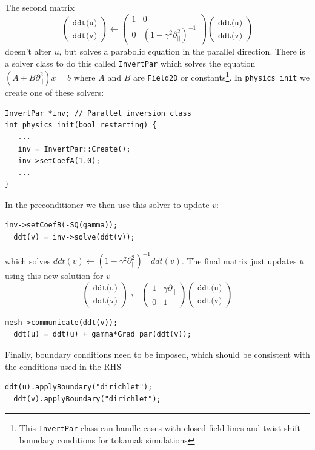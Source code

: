 \documentclass[12pt]{article}
\begin{document}
The second matrix
\[
\left(\begin{array}{c}
\texttt{ddt(u)} \\
\texttt{ddt(v)}
\end{array}\right) \leftarrow \left(\begin{array}{cc}
1 & 0 \\
0 & \left(1 - \gamma^2\partial^2_{||}\right)^{-1}
\end{array}\right)\left(\begin{array}{c}
\texttt{ddt(u)} \\
\texttt{ddt(v)}
\end{array}\right)
\]
doesn't alter $u$, but solves a parabolic equation in the parallel direction. There is a solver class to do this 
called \texttt{InvertPar} which solves the equation $\left(A + B\partial_{||}^2\right)x = b$ where $A$ and $B$ are
\lstinline!Field2D! or constants\footnote{This \texttt{InvertPar} class can handle cases with closed field-lines and twist-shift boundary conditions for tokamak simulations}. In \lstinline!physics_init! we create one of these solvers:
\begin{lstlisting}[numbers=none]
InvertPar *inv; // Parallel inversion class
int physics_init(bool restarting) {
   ...
   inv = InvertPar::Create();
   inv->setCoefA(1.0);
   ...
}
\end{lstlisting}
In the preconditioner we then use this solver to update $v$:
\begin{lstlisting}[numbers=none]
  inv->setCoefB(-SQ(gamma));
  ddt(v) = inv->solve(ddt(v));
\end{lstlisting}
which solves $ddt(v) \leftarrow \left(1 - \gamma^2\partial_{||}^2\right)^{-1} ddt(v)$.
The final matrix just updates $u$ using this new solution for $v$
\[
\left(\begin{array}{c}
\texttt{ddt(u)} \\
\texttt{ddt(v)}
\end{array}\right) \leftarrow \left(\begin{array}{cc}
1 & \gamma\partial_{||} \\
0 & 1
\end{array}\right)\left(\begin{array}{c}
\texttt{ddt(u)} \\
\texttt{ddt(v)}
\end{array}\right)
\]
\begin{lstlisting}[numbers=none]
  mesh->communicate(ddt(v));
  ddt(u) = ddt(u) + gamma*Grad_par(ddt(v));
\end{lstlisting}
Finally, boundary conditions need to be imposed, which should be consistent with the conditions used in the RHS
\begin{lstlisting}[numbers=none]
  ddt(u).applyBoundary("dirichlet");
  ddt(v).applyBoundary("dirichlet");
\end{lstlisting}
\end{document}
